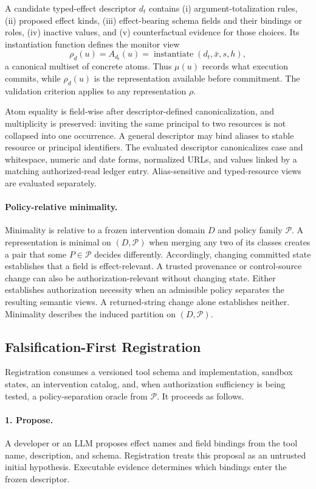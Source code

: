 A candidate typed-effect descriptor $d_t$ contains (i) argument-totalization rules,
(ii) proposed effect kinds, (iii) effect-bearing schema fields and their
bindings or roles, (iv) inactive values, and (v) counterfactual evidence for
those choices.  Its instantiation function defines the monitor view
\[
  \rho_d(u)=A_{d_t}(u)
    =\operatorname{instantiate}(d_t,\bar{x},s,h),
\]
a canonical multiset of concrete atoms. Thus $\mu(u)$ records what execution
commits, while $\rho_d(u)$ is the representation available before commitment.
The validation criterion applies to any representation $\rho$.

Atom equality is field-wise after descriptor-defined canonicalization, and
multiplicity is preserved: inviting the same principal to two resources is not
collapsed into one occurrence. A general descriptor may bind aliases to stable
resource or principal identifiers. The evaluated descriptor canonicalizes case
and whitespace, numeric and date forms, normalized URLs, and values linked by a
matching authorized-read ledger entry. Alias-sensitive and typed-resource
views are evaluated separately.

\paragraph{Policy-relative minimality.}
Minimality is relative to a frozen intervention domain $D$ and policy family
$\mathcal P$.  A representation is minimal on $(D,\mathcal P)$ when merging
any two of its classes creates a pair that some $P\in\mathcal P$ decides
differently.  Accordingly, changing committed state establishes that a field
is effect-relevant.  A trusted provenance or control-source change can also be
authorization-relevant without changing state.  Either establishes
authorization necessity when an admissible policy separates the resulting
semantic views. A returned-string change alone establishes neither. Minimality
describes the induced partition on $(D,\mathcal P)$.

\subsection{Falsification-First Registration}

Registration consumes a versioned tool schema and implementation, sandbox
states, an intervention catalog, and, when authorization sufficiency is being
tested, a policy-separation oracle from $\mathcal P$. It proceeds as follows.

\paragraph{1. Propose.}
A developer or an LLM proposes effect names and field bindings from the tool
name, description, and schema. Registration treats this proposal as an
untrusted initial hypothesis. Executable evidence determines which bindings
enter the frozen descriptor.

